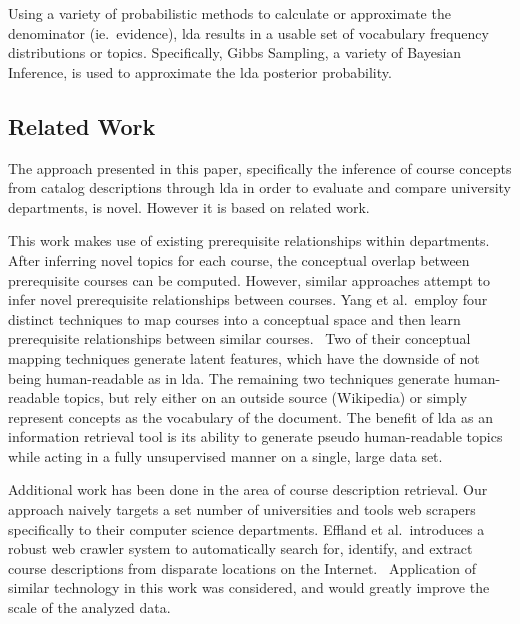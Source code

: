 
\noindent
Using a variety of probabilistic methods to calculate or approximate the denominator (ie.\ evidence), \ac{lda} results in a usable set of vocabulary frequency distributions or topics.
Specifically, Gibbs Sampling, a variety of Bayesian Inference, is used to approximate the \ac{lda} posterior probability.~\cite{Blei2003}


\subsection{Related Work}
\label{sec:related-work}


The approach presented in this paper, specifically the inference of course concepts from catalog descriptions through \ac{lda} in order to evaluate and compare university departments, is novel.
However it is based on related work.


This work makes use of existing prerequisite relationships within departments.
After inferring novel topics for each course, the conceptual overlap between prerequisite courses can be computed.
However, similar approaches attempt to infer novel prerequisite relationships between courses.
Yang et al.\ employ four distinct techniques to map courses into a conceptual space and then learn prerequisite relationships between similar courses.~\cite{Yang2015}
Two of their conceptual mapping techniques generate latent features, which have the downside of not being human-readable as in \ac{lda}.
The remaining two techniques generate human-readable topics, but rely either on an outside source (Wikipedia) or simply represent concepts as the vocabulary of the document.
The benefit of \ac{lda} as an information retrieval tool is its ability to generate pseudo human-readable topics while acting in a fully unsupervised manner on a single, large data set.


Additional work has been done in the area of course description retrieval.
Our approach naively targets a set number of universities and tools web scrapers specifically to their computer science departments.
Effland et al.\ introduces a robust web crawler system to automatically search for, identify, and extract course descriptions from disparate locations on the Internet.~\cite{Effland2015}
Application of similar technology in this work was considered, and would greatly improve the scale of the analyzed data.



